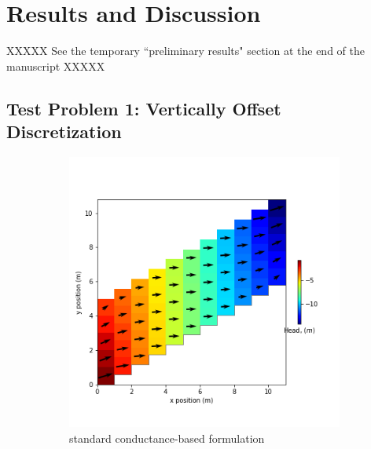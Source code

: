 \documentclass{article}
\begin{document}
\section{Results and Discussion}

XXXXX See the temporary ``preliminary results" section at the end of the manuscript XXXXX

\subsection{Test Problem 1: Vertically Offset Discretization}

\begin{figure}[H]
\centering
\begin{subfigure}{0.4\textwidth}
	\includegraphics[width=\textwidth]{../figures/disu-af-vo-s-head.png}
	\caption{standard conductance-based formulation}
	\label{fig:disu-s-nocc-head}
\end{subfigure}
\hfill
\begin{subfigure}{0.4\textwidth}

\end{subfigure}
\end{figure}
\end{document}

